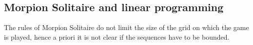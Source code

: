 \subsection{Morpion Solitaire and linear programming}
The rules of Morpion Solitaire do not limit the size of the grid on which the game is played, hence a priori
  it is not clear if the sequences have to be bounded.
%  
